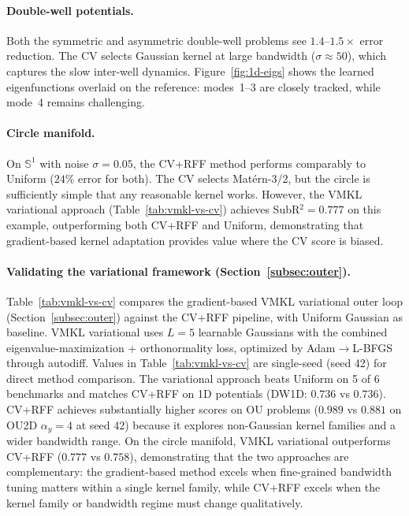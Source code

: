 \documentclass[11pt]{article}
\theoremstyle{remark}
\begin{document}
\paragraph{Double-well potentials.}
Both the symmetric and asymmetric double-well problems see $1.4$--$1.5\times$ error reduction.
The CV selects Gaussian kernel at large bandwidth ($\sigma\approx50$), which captures the slow inter-well dynamics.
Figure~\ref{fig:1d-eigs} shows the learned eigenfunctions overlaid on the reference: modes~1--3 are closely tracked, while mode~4 remains challenging.

\paragraph{Circle manifold.}
On $\mathbb{S}^1$ with noise $\sigma=0.05$, the CV+RFF method performs comparably to Uniform ($24\%$ error for both).
The CV selects Mat\'ern-3/2, but the circle is sufficiently simple that any reasonable kernel works.
However, the VMKL variational approach (Table~\ref{tab:vmkl-vs-cv}) achieves SubR$^2=0.777$ on this example, outperforming both CV+RFF and Uniform, demonstrating that gradient-based kernel adaptation provides value where the CV score is biased.

\paragraph{Validating the variational framework (Section~\ref{subsec:outer}).}
Table~\ref{tab:vmkl-vs-cv} compares the gradient-based VMKL variational outer loop (Section~\ref{subsec:outer}) against the CV+RFF pipeline, with Uniform Gaussian as baseline.
VMKL variational uses $L=5$ learnable Gaussians with the combined eigenvalue-maximization + orthonormality loss, optimized by Adam$\to$L-BFGS through autodiff. Values in Table~\ref{tab:vmkl-vs-cv} are single-seed (seed 42) for direct method comparison.
The variational approach beats Uniform on 5 of 6 benchmarks and matches CV+RFF on 1D potentials (DW1D: $0.736$ vs $0.736$).
CV+RFF achieves substantially higher scores on OU problems ($0.989$ vs $0.881$ on OU2D $\alpha_y=4$ at seed 42) because it explores non-Gaussian kernel families and a wider bandwidth range.
On the circle manifold, VMKL variational outperforms CV+RFF ($0.777$ vs $0.758$), demonstrating that the two approaches are complementary: the gradient-based method excels when fine-grained bandwidth tuning matters within a single kernel family, while CV+RFF excels when the kernel family or bandwidth regime must change qualitatively.
\end{document}
